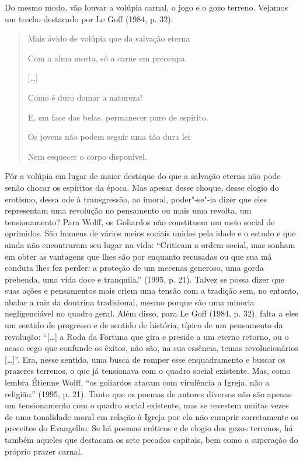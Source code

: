 Do mesmo modo, vão louvar a volúpia carnal, o jogo e o gozo terreno.
Vejamos um trecho destacado por Le Goff (1984, p. 32):

\begin{quote}
Mais ávido de volúpia que da salvação eterna

Com a alma morta, só a carne em preocupa

[\ldots{}]

Como é duro domar a natureza!

E, em face das belas, permanecer puro de espírito.

Os jovens não podem seguir uma tão dura lei

Nem esquecer o corpo disponível.
\end{quote}

Pôr a volúpia em lugar de maior destaque do que a salvação eterna não
pode senão chocar os espíritos da época. Mas apesar desse choque, desse
elogio do erotismo, dessa ode à transgressão, ao imoral, poder"-se"-ia
dizer que eles representam uma revolução no pensamento ou mais uma
revolta, um tensionamento? Para Wolff, os Goliardos não constituem um
meio social de oprimidos. São homens de vários meios sociais unidos pela
idade e o estudo e que ainda não encontraram seu lugar na vida:
``Criticam a ordem social, mas sonham em obter as vantagens que lhes são
por enquanto recusadas ou que sua má conduta lhes fez perder: a proteção
de um mecenas generoso, uma gorda prebenda, uma vida doce e tranquila.''
(1995, p. 21). Talvez se possa dizer que suas ações e pensamentos mais
criem uma tensão com a tradição sem, no entanto, abalar a raiz da
doutrina tradicional, mesmo porque são uma minoria negligenciável no
quadro geral. Além disso, para Le Goff (1984, p. 32), falta a eles um
sentido de progresso e de sentido de história, típico de um pensamento
da revolução: ``[\ldots{}] a Roda da Fortuna que gira e preside a um
eterno retorno, ou o acaso cego que confunde os êxitos, não são, na sua
essência, temas revolucionários [\ldots{}]''. Era, nesse sentido, uma
busca de romper esse enquadramento e buscar os prazeres terrenos, o que
já tensionava com o quadro social existente. Mas, como lembra Étienne
Wolff, ``os goliardos atacam com virulência a Igreja, não a religião.''
(1995, p. 21). Tanto que os poemas de autores diversos não são apenas um
tensionamento com o quadro social existente, mas se revestem muitas
vezes de uma tonalidade moral em relação à Igreja por ela não cumprir
corretamente os preceitos do Evangelho. Se há poemas eróticos e de
elogio dos gozos terrenos, há também aqueles que destacam os sete
pecados capitais, bem como a superação do próprio prazer carnal.

